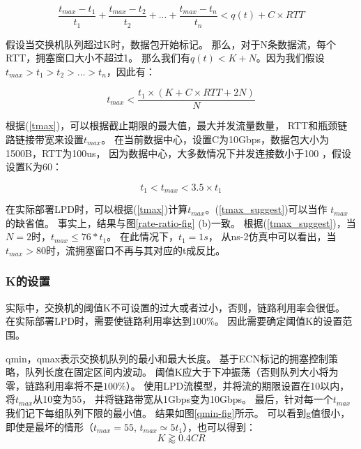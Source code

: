 \begin{equation}
\label{tmaxprocess}
\frac{t_{max}-t_1}{t_1}+\frac{t_{max}-t_2}{t_2}+...+\frac{t_{max}-t_n}{t_n} <q(t)+C\times RTT
\end{equation}



假设当交换机队列超过K时，数据包开始标记。
那么，对于N条数据流，每个RTT，拥塞窗口大小不超过1。
那么我们有$q(t) < K+N$。因为我们假设$t_{max}>t_1>t_2>…>t_n$，因此有：


\begin{equation}
\label{tmax}
t_{max}<\frac{t_1\times(K+C\times RTT+2N)}{N}
\end{equation}

根据(\ref{tmax})，可以根据截止期限的最大值，最大并发流量数量，
RTT和瓶颈链路链接带宽来设置$t_{max}$。 
在当前数据中心，设置C为10Gbps，数据包大小为1500B，RTT为100us，
因为数据中心，大多数情况下并发连接数小于100 \cite{DCTCP}，假设设置K为60：


 \begin{equation}
\label{tmax_suggest}
t_1< t_{max}<3.5\times t_1
\end{equation}

在实际部署LPD时，可以根据(\ref{tmax})计算$t_{max}$。(\ref{tmax_suggest})可以当作 $t_{max}$的缺省值。
事实上，结果与图\ref{rate-ratio-fig} (b)一致。 
根据(\ref{tmax_suggest})，当$N = 2$时，$t_{max}\le76* t_1$。
在此情况下，$t_1 = 1s$， 从ns-2仿真中可以看出，当$t_{max}> 80$时，流拥塞窗口不再与其对应的t成反比。

\subsubsection{K的设置}
实际中，交换机的阈值K不可设置的过大或者过小，否则，链路利用率会很低。
在实际部署LPD时，需要使链路利用率达到$100\%$。
因此需要确定阈值K的设置范围\cite{DCTCPAnalysis}。

qmin，qmax表示交换机队列的最小和最大长度。
基于ECN标记的拥塞控制策略，队列长度在固定区间内波动。
阈值K应大于下冲振荡（否则队列大小将为零，链路利用率将不是$100\%$）。 
使用LPD流模型，并将流的期限设置在10以内，将$t_{max}$从10变为55，
并将链路带宽从1Gbps变为10Gbps。 
最后，针对每一个$t_{max}$我们记下每组队列下限的最小值。
结果如图\ref{qmin-fig}所示。
可以看到g值很小，即使是最坏的情形（$t_{max} = 55$, $t_{max}\simeq 5 t_1$），也可以得到：
\begin{equation}
\label{KRANGE}
K \gtrapprox0.4 CR
\end{equation}


